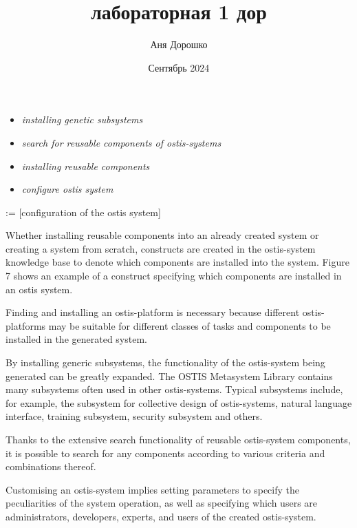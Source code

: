 \documentclass[twocolumn]{article}
\title{лабораторная 1 дор}
\author{Аня Дорошко}
\date{Сентябрь 2024} %
\begin{document}
\setcounter{mycounter}{8}
\setcounter{seccounter}{9}
\begin{multicols}{2}
\raggedleft
\end{multicols}


    


\begin{itemize}[itemsep=0pt, topsep=0pt]
    \item\textit{     installing genetic subsystems}  
    \item\textit{   search for reusable components of ostis-systems}
    \item \textit {     installing reusable components}
    \item \textit {     configure ostis system}
\end{itemize}
 \qquad\quad:=   [configuration of the ostis system]

 \quad\quad\textrangle

   \quad Whether installing reusable components into an already created system or creating a system from scratch,
constructs are created in the ostis-system knowledge base
to denote which components are installed into the system.
Figure 7 shows an example of a construct specifying
which components are installed in an ostis system.

\quad Finding and installing an ostis-platform is necessary
because different ostis-platforms may be suitable for
different classes of tasks and components to be installed
in the generated system.

\quad By installing generic subsystems, the functionality
of the ostis-system being generated can be greatly expanded. The OSTIS Metasystem Library contains many
subsystems often used in other ostis-systems. Typical
subsystems include, for example, the subsystem for collective design of ostis-systems, natural language interface,
training subsystem, security subsystem and others.

\quad Thanks to the extensive search functionality of
reusable ostis-system components, it is possible to search
for any components according to various criteria and
combinations thereof.

\quad Customising an ostis-system implies setting parameters to specify the peculiarities of the system operation,
as well as specifying which users are administrators,
developers, experts, and users of the created ostis-system.
\end{document}
